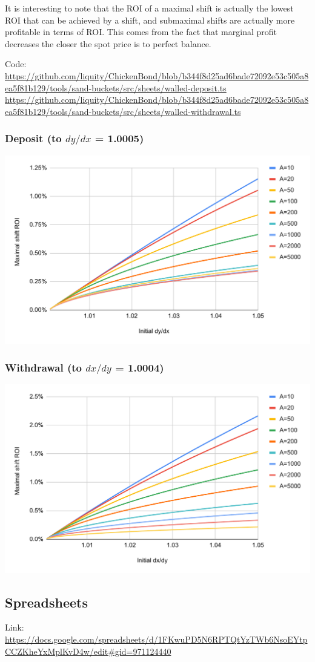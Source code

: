 \documentclass{article}
\begin{document}
It is interesting to note that the ROI of a maximal shift is actually the lowest ROI that can be achieved by a shift, and submaximal shifts are actually more profitable in terms of ROI. This comes from the fact that marginal profit decreases the closer the spot price is to perfect balance.

Code:
\url{https://github.com/liquity/ChickenBond/blob/b344f8d25ad6bade72092e53c505a8ea5f81b129/tools/sand-buckets/src/sheets/walled-deposit.ts}
\url{https://github.com/liquity/ChickenBond/blob/b344f8d25ad6bade72092e53c505a8ea5f81b129/tools/sand-buckets/src/sheets/walled-withdrawal.ts}

\subsubsection{Deposit (to $dy/dx$ = 1.0005)}

\includegraphics[width=\linewidth]{./LUSDChickenBonds_Shifting_Profitability_5.png}

\subsubsection{Withdrawal (to $dx/dy$ = 1.0004)}

\includegraphics[width=\linewidth]{./LUSDChickenBonds_Shifting_Profitability_6.png}

\subsection{Spreadsheets}

Link:
\url{https://docs.google.com/spreadsheets/d/1FKwuPD5N6RPTQtYzTWb6NsoEYtpCCZKheYxMplKvD4w/edit#gid=971124440}
\end{document}

